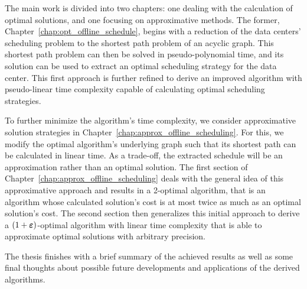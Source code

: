The main work is divided into two chapters: one dealing with the calculation of optimal solutions, and one focusing on approximative methods. The former, Chapter~\ref{chap:opt_offline_schedule}, begins with a reduction of the data centers' scheduling problem to the shortest path problem of an acyclic graph. This shortest path problem can then be solved in pseudo-polynomial time, and its solution can be used to extract an optimal scheduling strategy for the data center. This first approach is further refined to derive an improved algorithm with pseudo-linear time complexity capable of calculating optimal scheduling strategies. 

To further minimize the algorithm's time complexity, we consider approximative solution strategies in Chapter~\ref{chap:approx_offline_scheduling}. For this, we modify the optimal algorithm's underlying graph such that its shortest path can be calculated in linear time. As a trade-off, the extracted schedule will be an approximation rather than an optimal solution. The first section of Chapter~\ref{chap:approx_offline_scheduling} deals with the general idea of this approximative approach and results in a 2-optimal algorithm, that is an algorithm whose calculated solution's cost is at most twice as much as an optimal solution's cost. The second section then generalizes this initial approach to derive a $(1+\boldsymbol\varepsilon)$-optimal algorithm with linear time complexity that is able to approximate optimal solutions with arbitrary precision.

The thesis finishes with a brief summary of the achieved results as well as some final thoughts about possible future developments and applications of the derived algorithms.
